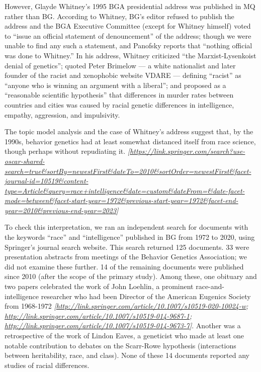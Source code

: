 \documentclass[12pt]{article}
\begin{document}
However, Glayde Whitney's 1995 BGA presidential address was published in MQ rather than BG. According to Whitney, BG's editor refused to publish the address and the BGA Executive Committee (except for Whitney himself) voted to ``issue an official statement of denouncement'' of the address; though we were unable to find any such a statement, and Panofsky reports that ``nothing official was done to Whitney.'' In his address, Whitney criticized ``the Marxist-Lysenkoist denial of genetics''; quoted Peter Brimelow --- a white nationalist and later founder of the racist and xenophobic website VDARE --- defining ``racist'' as ``anyone who is winning an argument with a liberal''; and proposed as a ``reasonable scientific hypothesis'' that differences in murder rates between countries and cities was caused by racial genetic differences in intelligence, empathy, aggression, and impulsivity.

The topic model analysis and the case of Whitney's address suggest that, by the 1990s, behavior genetics had at least somewhat distanced itself from race science, though perhaps without repudiating it. \emph{{[}\url{https://link.springer.com/search?use-oscar-shared-search=true\&sortBy=newestFirst\&dateTo=2010\&sortOrder=newestFirst\&facet-journal-id=10519\&content-type=Article\&query=race+intelligence\&date=custom\&dateFrom=\&date-facet-mode=between\&facet-start-year=1972\&previous-start-year=1972\&facet-end-year=2010\&previous-end-year=2023}{]}}

To check this interpretation, we ran an independent search for documents with the keywords ``race'' and ``intelligence'' published in BG from 1972 to 2020, using Springer's journal search website. This search returned 125 documents. 33 were presentation abstracts from meetings of the Behavior Genetics Association; we did not examine these further. 14 of the remaining documents were published since 2010 (after the scope of the primary study). Among these, one obituary and two papers celebrated the work of John Loehlin, a prominent race-and-intelligence researcher who had been Director of the American Eugenics Society from 1968-1972 \emph{{[}\url{http://link.springer.com/article/10.1007/s10519-020-10024-w}; \url{http://link.springer.com/article/10.1007/s10519-014-9687-1}; \url{http://link.springer.com/article/10.1007/s10519-014-9673-7}{]}}. Another was a retrospective of the work of Lindon Eaves, a geneticist who made at least one notable contribution to debates on the Scarr-Rowe hypothesis (interactions between heritability, race, and class). None of these 14 documents reported any studies of racial differences.
\end{document}
